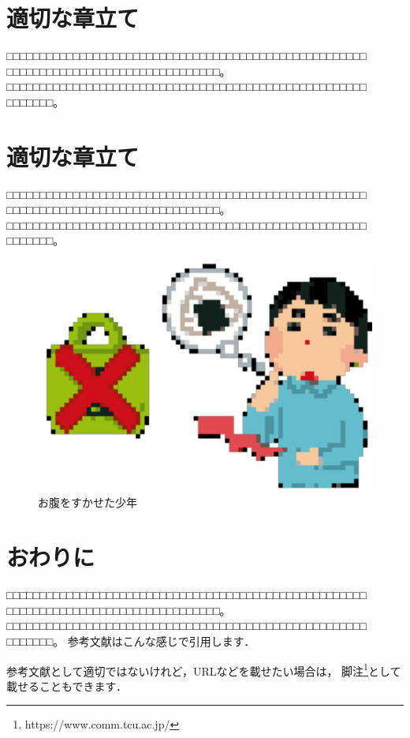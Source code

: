 \documentclass[a4paper,9pt,twocolumn,dvipdfmx]{jarticle}
\begin{document}
\section{適切な章立て}
□□□□□□□□□□□□□□□□□□□□□□□□□□□□□□□□□□□□□□□□□□□□□□□□□□□□□□
□□□□□□□□□□□□□□□□□□□□□□□□□□□□□□□□。
□□□□□□□□□□□□□□□□□□□□□□□□□□□□□□□□□□□□□□□□□□□□□□□□□□□□□□
□□□□□□□。

\section{適切な章立て}
□□□□□□□□□□□□□□□□□□□□□□□□□□□□□□□□□□□□□□□□□□□□□□□□□□□□□□
□□□□□□□□□□□□□□□□□□□□□□□□□□□□□□□□。
□□□□□□□□□□□□□□□□□□□□□□□□□□□□□□□□□□□□□□□□□□□□□□□□□□□□□□
□□□□□□□。

\begin{figure}
\centering
\includegraphics{image/hungry.pdf}
\caption{お腹をすかせた少年}
\label{fig:whole}
\end{figure}

\section{おわりに}
□□□□□□□□□□□□□□□□□□□□□□□□□□□□□□□□□□□□□□□□□□□□□□□□□□□□□□
□□□□□□□□□□□□□□□□□□□□□□□□□□□□□□□□。
□□□□□□□□□□□□□□□□□□□□□□□□□□□□□□□□□□□□□□□□□□□□□□□□□□□□□□
□□□□□□□。
参考文献はこんな感じで引用します．
\cite{Git}

参考文献として適切ではないけれど，URLなどを載せたい場合は，
脚注\footnote{https://www.comm.tcu.ac.jp/}として載せることもできます．




\end{document}
